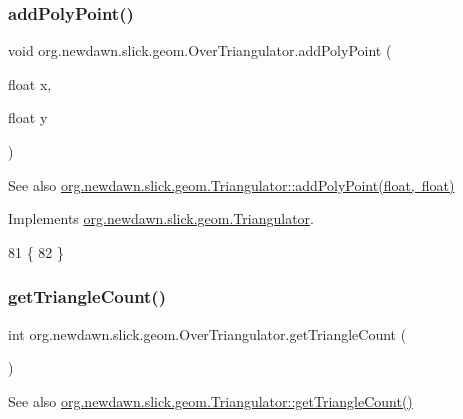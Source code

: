\subsubsection{\texorpdfstring{add\+Poly\+Point()}{addPolyPoint()}}
{\footnotesize\ttfamily void org.\+newdawn.\+slick.\+geom.\+Over\+Triangulator.\+add\+Poly\+Point (\begin{DoxyParamCaption}\item[{float}]{x,  }\item[{float}]{y }\end{DoxyParamCaption})\hspace{0.3cm}{\ttfamily [inline]}}

\begin{DoxySeeAlso}{See also}
\mbox{\hyperlink{interfaceorg_1_1newdawn_1_1slick_1_1geom_1_1_triangulator_a32b11eccb582c7f4993a944df0b1db65}{org.\+newdawn.\+slick.\+geom.\+Triangulator\+::add\+Poly\+Point(float, float)}} 
\end{DoxySeeAlso}


Implements \mbox{\hyperlink{interfaceorg_1_1newdawn_1_1slick_1_1geom_1_1_triangulator_a32b11eccb582c7f4993a944df0b1db65}{org.\+newdawn.\+slick.\+geom.\+Triangulator}}.


\begin{DoxyCode}
81                                                \{
82     \}
\end{DoxyCode}
\mbox{\label{classorg_1_1newdawn_1_1slick_1_1geom_1_1_over_triangulator_a465acf51a252501448c8f29fa05c07ce}} 
\subsubsection{\texorpdfstring{get\+Triangle\+Count()}{getTriangleCount()}}
{\footnotesize\ttfamily int org.\+newdawn.\+slick.\+geom.\+Over\+Triangulator.\+get\+Triangle\+Count (\begin{DoxyParamCaption}{ }\end{DoxyParamCaption})\hspace{0.3cm}{\ttfamily [inline]}}

\begin{DoxySeeAlso}{See also}
\mbox{\hyperlink{interfaceorg_1_1newdawn_1_1slick_1_1geom_1_1_triangulator_a7a5d68a694f2b80878c48563b5ea6f1f}{org.\+newdawn.\+slick.\+geom.\+Triangulator\+::get\+Triangle\+Count()}} 
\end{DoxySeeAlso}


